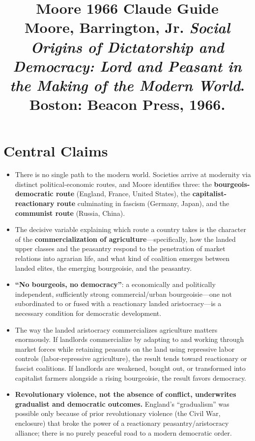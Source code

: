 \documentclass[12pt]{article}
\title{\textbf{Moore 1966 Claude Guide}\\
\large Moore, Barrington, Jr. \textit{Social Origins of Dictatorship and Democracy: Lord and Peasant in the Making of the Modern World}.\\
Boston: Beacon Press, 1966.}
\author{}
\date{}
\begin{document}
\maketitle
\tableofcontents
\newpage

\section{Central Claims}

\begin{itemize}[leftmargin=*, itemsep=4pt]
    \item There is no single path to the modern world. Societies arrive at modernity via distinct political-economic routes, and Moore identifies three: the \textbf{bourgeois-democratic route} (England, France, United States), the \textbf{capitalist-reactionary route} culminating in fascism (Germany, Japan), and the \textbf{communist route} (Russia, China).
    \item The decisive variable explaining which route a country takes is the character of the \textbf{commercialization of agriculture}---specifically, how the landed upper classes and the peasantry respond to the penetration of market relations into agrarian life, and what kind of coalition emerges between landed elites, the emerging bourgeoisie, and the peasantry.
    \item \textbf{``No bourgeois, no democracy''}: a economically and politically independent, sufficiently strong commercial/urban bourgeoisie---one not subordinated to or fused with a reactionary landed aristocracy---is a necessary condition for democratic development.
    \item The way the landed aristocracy commercializes agriculture matters enormously. If landlords commercialize by adapting to and working through market forces while retaining peasants on the land using repressive labor controls (labor-repressive agriculture), the result tends toward reactionary or fascist coalitions. If landlords are weakened, bought out, or transformed into capitalist farmers alongside a rising bourgeoisie, the result favors democracy.
    \item \textbf{Revolutionary violence, not the absence of conflict, underwrites gradualist and democratic outcomes.} England's ``gradualism'' was possible only because of prior revolutionary violence (the Civil War, enclosure) that broke the power of a reactionary peasantry/aristocracy alliance; there is no purely peaceful road to a modern democratic order.

\end{itemize}
\end{document}

